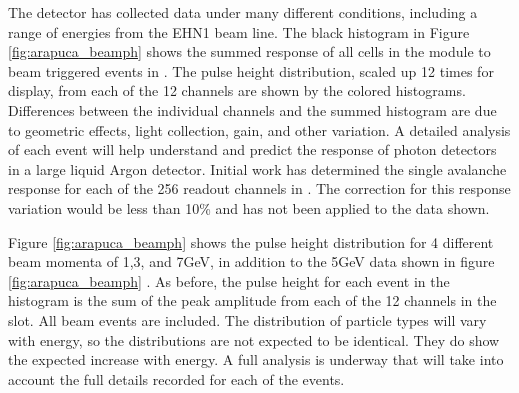 The detector has collected data under many different conditions, including a range of energies from the EHN1 beam line.  The black histogram in Figure \ref{fig:arapuca_beamph} shows the summed response of all  cells in the module to beam triggered events in .  The pulse height distribution, scaled up \num{12} times for display, from each of the \num{12} channels are shown by the colored histograms.  Differences between the individual channels and the summed histogram are due to geometric effects, light collection, gain, and other variation.  A detailed analysis of each event will help understand and predict the response of photon detectors in a large liquid Argon detector.
Initial work has determined the single avalanche response for each of the \num{256} readout channels in . The correction for this response variation would be less than 10\% and has not been applied to the data shown.

Figure \ref{fig:arapuca_beamph} shows the pulse height distribution for 4 different beam momenta of \num{1},\num{3}, and \num{7}{GeV}, in addition to the \num{5}{GeV} data shown in figure \ref{fig:arapuca_beamph} .  As before, the pulse height for each event in the histogram is the sum of the peak amplitude from each of the \num{12}  channels in the slot.  All beam events are included. The distribution of particle types will vary with energy, so the distributions are not expected to be identical.  They do show the expected increase with energy.  A full analysis is underway that will take into account the full details recorded for each of the events.  
 


